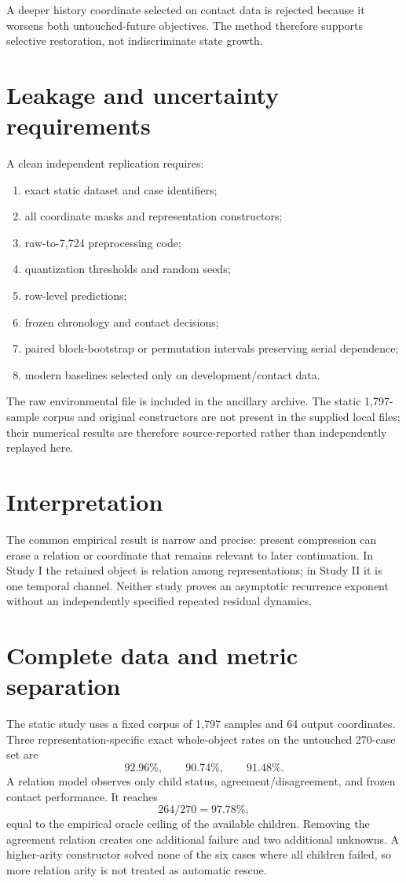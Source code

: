 \documentclass[11pt,a4paper]{article}
\begin{document}
A deeper history coordinate selected on contact data is rejected because it worsens both untouched-future objectives. The method therefore supports selective restoration, not indiscriminate state growth.

\section{Leakage and uncertainty requirements}
A clean independent replication requires:
\begin{enumerate}
\item exact static dataset and case identifiers;
\item all coordinate masks and representation constructors;
\item raw-to-7,724 preprocessing code;
\item quantization thresholds and random seeds;
\item row-level predictions;
\item frozen chronology and contact decisions;
\item paired block-bootstrap or permutation intervals preserving serial dependence;
\item modern baselines selected only on development/contact data.
\end{enumerate}
The raw environmental file is included in the ancillary archive. The static 1,797-sample corpus and original constructors are not present in the supplied local files; their numerical results are therefore source-reported rather than independently replayed here.

\section{Interpretation}
The common empirical result is narrow and precise: present compression can erase a relation or coordinate that remains relevant to later continuation. In Study I the retained object is relation among representations; in Study II it is one temporal channel. Neither study proves an asymptotic recurrence exponent without an independently specified repeated residual dynamics.


\section{Complete data and metric separation}
The static study uses a fixed corpus of 1,797 samples and 64 output coordinates. Three representation-specific exact whole-object rates on the untouched 270-case set are
\begin{equation}
92.96\%,\qquad90.74\%,\qquad91.48\%.
\end{equation}
A relation model observes only child status, agreement/disagreement, and frozen contact performance. It reaches
\begin{equation}
\boxed{264/270=97.78\%},
\end{equation}
equal to the empirical oracle ceiling of the available children. Removing the agreement relation creates one additional failure and two additional unknowns. A higher-arity constructor solved none of the six cases where all children failed, so more relation arity is not treated as automatic rescue.
\end{document}

